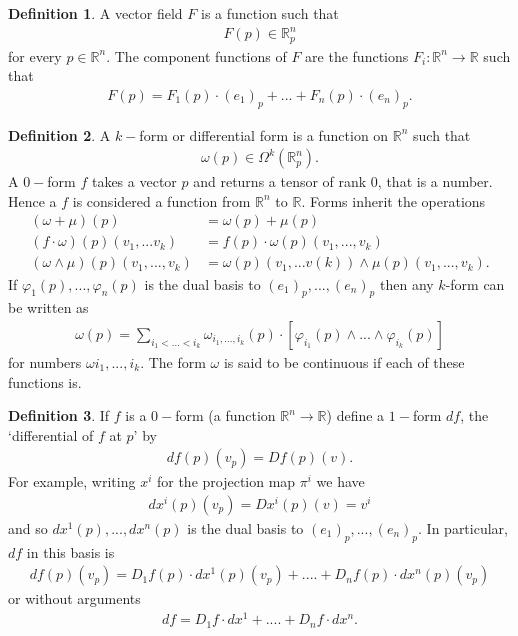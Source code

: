 \documentclass[20pt]{article}
\theoremstyle{plain}
\theoremstyle{definition}
\newtheorem{definition}{Definition}
\newcommand{\reals}{\mathbb{R}}
\begin{document}
\begin{definition}
  A vector field $F$ is a function such that 
  \begin{align*}
    F(p) \in \reals^n_p
  \end{align*}
  for every $p \in \reals^n.$  The component functions of $F$ are the functions 
  $F_i: \reals^n \to \reals$ such that 
  \begin{align*}
    F(p) = F_1(p)\cdot(e_1)_p + ... + F_n(p)\cdot(e_n)_p.
  \end{align*}
\end{definition}

\begin{definition}
  A $k-$form or differential form is a function on $\reals^n$ such that
  \begin{align*}
    \omega(p) \in \Omega^k(\reals^n_p).
  \end{align*}
  A $0-$form $f$ takes a vector $p$ and returns a tensor of rank $0$, that is a number.
  Hence a $f$ is considered a function from $\reals^n$ to $\reals.$
  Forms inherit the operations
  \begin{align*}
    (\omega + \mu)(p) &= \omega(p) + \mu(p)\\
    (f \cdot \omega)(p)(v_1, ...v_k) &= f(p) \cdot \omega(p)(v_1, ..., v_k)\\
    (\omega \wedge \mu)(p)(v_1, ..., v_k) &= \omega(p)(v_1,...v(k)) \wedge \mu(p)(v_1, ..., v_k).
  \end{align*}
  If $\varphi_1(p), ..., \varphi_n(p)$ is the dual basis to $(e_1)_p, ..., (e_n)_p$ then any $k$-form can be written as
  \begin{align*}
    \omega(p) = \sum_{i_1<...<i_k} \omega_{i_1, ..., i_k}(p)\cdot[\varphi_{i_1}(p)\wedge...\wedge\varphi_{i_k}(p)]
  \end{align*}
  for numbers $\omega{i_1,...,i_k}$.  The form $\omega$ is said to be continuous if each of these functions is.

  \end{definition}

  \begin{definition}
    If $f$ is a $0-$form (a function $\reals^n \to \reals$) define a $1-$form $df$, the  `differential of $f$ at $p$' by
    \begin{align*}
      df(p)(v_p) = Df(p)(v).
    \end{align*}
    For example, writing $x^i$ for the projection map $\pi^i$ we have 
    \begin{align*}
      dx^i(p)(v_p) = Dx^i(p)(v) = v^i
    \end{align*}
    and so $dx^1(p), ..., dx^n(p)$ is the dual basis to $(e_1)_p, ..., (e_n)_p.$ 
    In particular, $df$ in this basis is 
    \begin{align*}
      df(p)(v_p) = D_1f(p) \cdot dx^1(p)(v_p) + .... + D_nf(p)\cdot dx^n(p)(v_p)
    \end{align*}
    or without arguments 
    \begin{align*}
      df = D_1f\cdot dx^1 + .... + D_nf \cdot dx^n.
    \end{align*}
  \end{definition}
\end{document}
